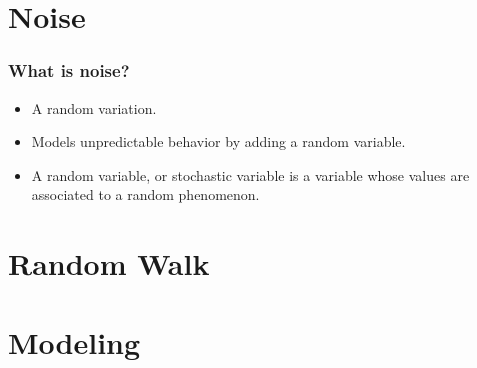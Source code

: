 \section{Noise}

\begin{frame}
  \frametitle{What is noise?}
  \begin{itemize}
  \item A random variation.
  \item Models unpredictable behavior by adding a random variable.
  \item A random variable, or stochastic variable is a variable whose values are associated to a random phenomenon.
  \end{itemize}
\end{frame}

\section{Random Walk}

\section{Modeling}

